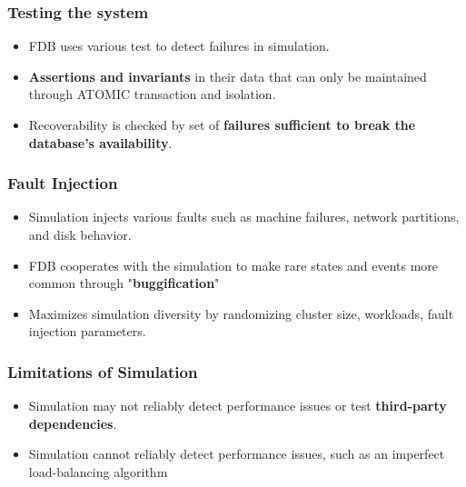 \begin{frame}
    \frametitle{Testing the system}
    \begin{itemize}
        \item FDB uses various test to detect failures in simulation.
        \item \textbf{Assertions and invariants}
in their data that can only be maintained through ATOMIC transaction and isolation.
        \item Recoverability is checked by set of \textbf{failures sufficient to break
the database’s availability}.
    \end{itemize}
\end{frame}
\begin{frame}
    \frametitle{Fault Injection}
    \begin{itemize}
        \item Simulation injects various faults such as machine failures, network partitions, and disk behavior.
        \item FDB cooperates with the simulation to make rare states and events more common through "\textbf{buggification}"
        \item Maximizes simulation diversity by randomizing cluster size, workloads, fault injection parameters.
    \end{itemize}
\end{frame}
\begin{frame}
    \frametitle{Limitations of Simulation}
    \begin{itemize}
        \item Simulation may not reliably detect performance issues or test \textbf{third-party dependencies}.
        \item Simulation cannot reliably detect performance issues, such as an imperfect load-balancing algorithm
    \end{itemize}
\end{frame}